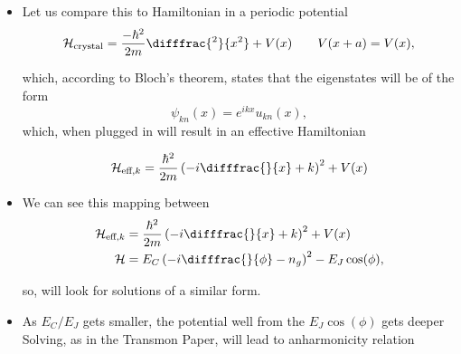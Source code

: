  \begin{itemize}
 	\item Let us compare this to Hamiltonian in a periodic potential
 	\begin{equation}\label{key}
 		\mathcal{H}_\text{crystal} = \frac{-\hbar^2}{2m}\difffrac{^2}{x^2}+V(x)\qquad V(x+a) = V(x),
 	\end{equation}
 	
 	\noindent which, according to Bloch's theorem, states that the eigenstates will be of the form
 	\begin{equation}\label{key}
 		\psi_{kn}(x) = e^{ikx}u_{kn}(x),
 	\end{equation}
 	\noindent which, when plugged in will result in an effective Hamiltonian
 	
 	\begin{equation}\label{key}
 		\mathcal{H}_{\text{eff},k} = \frac{\hbar^2}{2m}\left(-i\difffrac{}{x}+k\right)^2 + V(x)
 	\end{equation}
 	\item We can see this mapping between
 	\begin{equation}\label{key}
 		\begin{aligned}
	 		\mathcal{H}_{\text{eff},k} & = \frac{\hbar^2}{2m}\left(-i\difffrac{}{x}+k\right)^2 + V(x)\\
	 		\mathcal{H} & = E_C\left(-i\difffrac{}{\phi} - n_g\right)^2 - E_J\cos(\phi),
 		\end{aligned}
 	\end{equation}
 	
 	\noindent so, will look for solutions of a similar form.
 	\item As $ E_C/E_J $ gets smaller, the potential well from the $ E_J\cos(\phi) $ gets deeper  Solving, as in the Transmon Paper, will lead to anharmonicity relation
 	
 \end{itemize}
 \newpage
 
 

